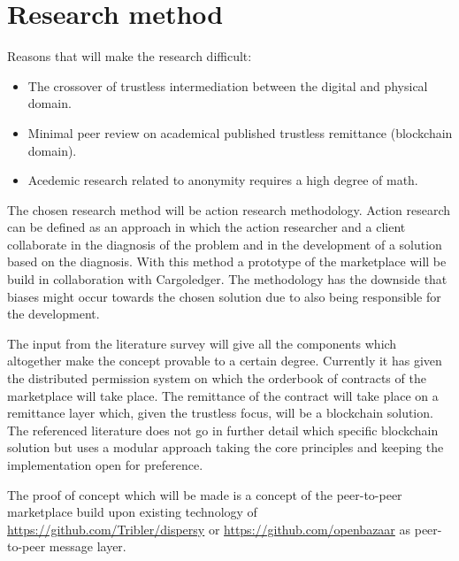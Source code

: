 \documentclass[11pt]{article}
\begin{document}
\section{Research method}

Reasons that will make the research difficult:
\begin{itemize}
  \item The crossover of trustless intermediation between the digital and physical domain.
  \item Minimal peer review on academical published trustless remittance (blockchain domain).
  \item Acedemic research related to anonymity requires a high degree of math. 
\end{itemize}

The chosen research method will be action research methodology. Action research can be defined as an approach in which the action researcher and a client collaborate in the diagnosis of the problem and in the development of a solution based on the diagnosis. With this method a prototype of the marketplace will be build in collaboration with Cargoledger. The methodology has the downside that biases might occur towards the chosen solution due to also being responsible for the development.\par

The input from the literature survey will give all the components which altogether make the concept provable to a certain degree. Currently it has given the distributed permission system on which the orderbook of contracts of the marketplace will take place. The remittance of the contract will take place on a remittance layer which, given the trustless focus, will be a blockchain solution. The referenced literature does not go in further detail which specific blockchain solution but uses a modular approach taking the core principles and keeping the implementation open for preference.\par
The proof of concept which will be made is a concept of the peer-to-peer marketplace build upon existing technology of \url{https://github.com/Tribler/dispersy} or \url{https://github.com/openbazaar} as peer-to-peer message layer.
\end{document}
